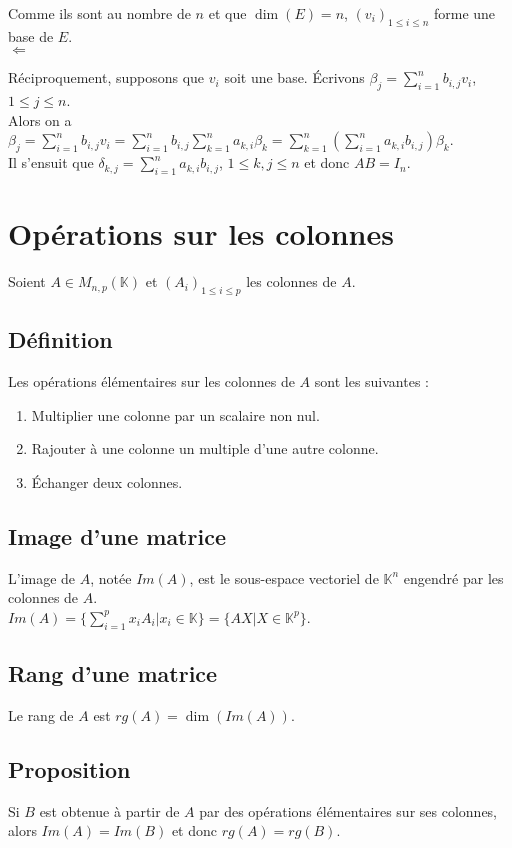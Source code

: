 \documentclass[a4paper,10pt]{book} %
\newcommand{\K}{\mathbb{K}}
\begin{document}
Comme ils sont au nombre de $n$ et que $\dim(E)=n$, $(v_i)_{1\leq i\leq n}$ forme une base de $E$.\\

$\Leftarrow$

Réciproquement, supposons que $v_i$ soit une base. Écrivons $\beta_j=\sum\limits_{i=1}^nb_{i,j}v_i$, $1\leq j\leq n$.\\
Alors on a $\beta_j=\sum\limits_{i=1}^n b_{i,j}v_i=\sum\limits_{i=1}^nb_{i,j}\sum\limits_{k=1}^n a_{k,i}\beta_k=\sum\limits_{k=1}^n(\sum\limits_{i=1}^n a_{k,i}b_{i,j})\beta_k$.\\
Il s'ensuit que $\delta_{k,j}=\sum\limits_{i=1}^n a_{k,i}b_{i,j}$, $1\leq k,j\leq n$
et donc $AB=I_n$.

\section{Opérations sur les colonnes}
Soient $A\in M_{n,p}(\K)$ et $(A_i)_{1\leq i\leq p}$ les colonnes de $A$.
\subsection{Définition}
Les opérations élémentaires sur les colonnes de $A$ sont les suivantes :
\begin{enumerate}
\item Multiplier une colonne par un scalaire non nul.
\item Rajouter à une colonne un multiple d'une autre colonne.
\item Échanger deux colonnes.
\end{enumerate}

\subsection{Image d'une matrice}
L'image de $A$, notée $Im(A)$, est le sous-espace vectoriel de $\K^n$ engendré par les colonnes de $A$.\\
$Im(A)=\{\sum\limits_{i=1}^px_iA_i | x_i \in \K\}=\{AX|X\in\K^p\}$.

\subsection{Rang d'une matrice}
Le rang de $A$ est $rg(A)=\dim(Im(A))$.

\subsection{Proposition}
Si $B$ est obtenue à partir de $A$ par des opérations élémentaires sur ses colonnes,\\
alors $Im(A)=Im(B)$ et donc $rg(A)=rg(B)$.
\end{document}
